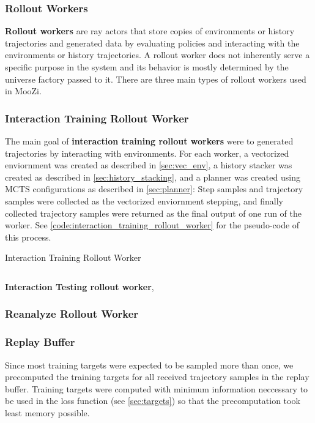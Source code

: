 \documentclass[12pt]{article}
\newcommand{\includecode}[2]{
\begin{listing}[H]
    \caption{#2}
    \label{code:#1}
    \inputminted[frame=single, framesep=10pt, fontsize=\footnotesize]{python}{src/#1.py}
\end{listing}   
}
\begin{document}
\subsubsection{Rollout Workers}
\textbf{Rollout workers} are ray actors that store copies of environments or history trajectories and generated data by evaluating policies and interacting with the environments or history trajectories.
A rollout worker does not inherently serve a specific purpose in the system and its behavior is mostly determined by the universe factory passed to it.
There are three main types of rollout workers used in MooZi.

\subsubsection{Interaction Training Rollout Worker} \label{sec:train_rw}
The main goal of \textbf{interaction training rollout workers} were to generated trajectories by interacting with environments.
For each worker, a vectorized enviornment was created as described in \ref{sec:vec_env}, a history stacker was created as described in \ref{sec:history_stacking}, and a planner was created using MCTS configurations as described in \ref{sec:planner}:
Step samples and trajectory samples were collected as the vectorized enviornment stepping, and finally collected trajectory samples were returned as the final output of one run of the worker.
See \ref{code:interaction_training_rollout_worker} for the pseudo-code of this process.

\includecode{interaction_training_rollout_worker}{Interaction Training Rollout Worker}

\textbf{Interaction Testing rollout worker},

\subsubsection{Reanalyze Rollout Worker} \label{sec:reanalyze_rw}

\subsubsection{Replay Buffer} \label{sec:replay}

Since most training targets were expected to be sampled more than once, we precomputed the training targets for all received trajectory samples in the replay buffer. 
Training targets were computed with minimum information neccessary to be used in the loss function (see \ref{sec:targets}) so that the precomputation took least memory possible.
\end{document}
